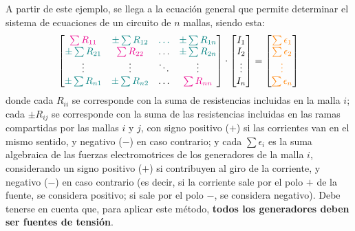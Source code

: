 	A partir de este ejemplo, se llega a la ecuación general que permite determinar el sistema de ecuaciones de un circuito de $n$ mallas, siendo esta: 
	\begin{equation*}
		\begin{bmatrix}
			{\color{magenta}\sum R_{11}} &  {\color{teal}\pm\sum R_{12}} & {\color{teal}{\dots}} & {\color{teal}\pm\sum R_{1n}} \\
			{\color{teal}\pm\sum R_{21}} & {\color{magenta}\sum R_{22}} & {{\dots}} & {\color{teal}\pm\sum R_{2n}} \\
			{\vdots} & {\vdots} &  {\ddots} & \vdots\\
			{\color{teal}\pm\sum R_{n1}} & {\color{teal}\pm\sum R_{n2}} & \dots & {\color{magenta}\sum R_{nn}}
		\end{bmatrix} \cdot 
		\begin{bmatrix}
			I_1\\
			I_2\\
			\vdots\\
			I_n
		\end{bmatrix} = %
		\begin{bmatrix}
			{\color{orange}\sum\epsilon_1}\\
			{\color{orange}\sum\epsilon_2}\\
			{\color{orange}\vdots}\\
			{\color{orange}\sum\epsilon_n}
		\end{bmatrix}
	\end{equation*}
	donde cada {\color{magenta}$R_{ii}$} se corresponde con la suma de resistencias incluidas en la malla $i$; cada {\color{teal}$\pm R_{ij}$} se corresponde con la suma de las resistencias incluidas en las ramas compartidas por las mallas $i$ y $j$, con signo positivo ($+$) si las corrientes van en el mismo sentido, y negativo ($-$) en caso contrario; y cada {\color{orange} $\sum \epsilon_i$} es la suma algebraica de las fuerzas electromotrices de los generadores de la malla $i$, considerando un signo positivo ($+$) si contribuyen al giro de la corriente, y negativo ($-$) en caso contrario (es decir, si la corriente sale por el polo $+$ de la fuente, se considera positivo; si sale por el polo $-$, se considera negativo). Debe tenerse en cuenta que, para aplicar este método, \textbf{todos los generadores deben ser fuentes de tensión}. 
	
